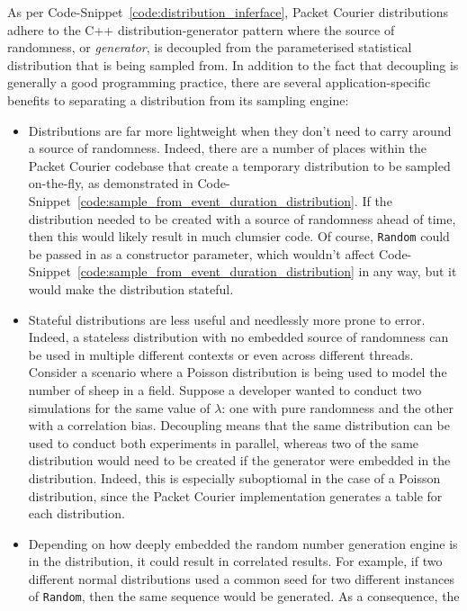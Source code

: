 As per Code-Snippet~\ref{code:distribution_inferface}, Packet Courier distributions adhere to the C++
distribution-generator pattern where the source of randomness, or \emph{generator}, is decoupled from the
parameterised statistical distribution that is being sampled from\cite{c++_random, c++_random_number_generation}. In
addition to the fact that decoupling is generally a good programming practice\cite{decoupling}, there are several
application-specific benefits to separating a distribution from its sampling
engine\cite{c++_random_number_generation_philosophy}:
\begin{itemize}
    \item Distributions are far more lightweight when they don't need to carry around a source of randomness. Indeed,
    there are a number of places within the Packet Courier codebase that create a temporary distribution to be
    sampled on-the-fly, as demonstrated in Code-Snippet~\ref{code:sample_from_event_duration_distribution}. If the
    distribution needed to be created with a source of randomness ahead of time, then this would likely result in
    much clumsier code. Of course, \texttt{Random} could be passed in as a constructor parameter, which wouldn't
    affect Code-Snippet~\ref{code:sample_from_event_duration_distribution} in any way, but it would make the
    distribution stateful.
    \item Stateful distributions are less useful and needlessly more prone to error. Indeed, a stateless distribution
    with no embedded source of randomness can be used in multiple different contexts or even across different
    threads. Consider a scenario where a Poisson distribution is being used to model the number of sheep in a field.
    Suppose a developer wanted to conduct two simulations for the same value of $\lambda$: one with pure randomness
    and the other with a correlation bias. Decoupling means that the same distribution can be used to conduct both
    experiments in parallel, whereas two of the same distribution would need to be created if the generator were
    embedded in the distribution. Indeed, this is especially suboptiomal in the case of a Poisson distribution,
    since the Packet Courier implementation generates a table for each distribution.
    \item Depending on how deeply embedded the random number generation engine is in the distribution, it could
    result in correlated results. For example, if two different normal distributions used a common seed for two
    different instances of \texttt{Random}, then the same sequence would be generated. As a consequence, the

\end{itemize}
